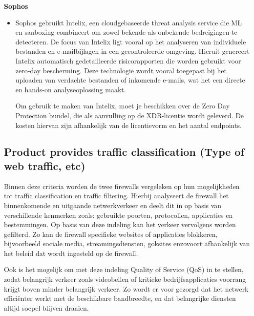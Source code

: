 \textbf{Sophos}
\begin{itemize}[label=\textbullet]
    \item Sophos gebruikt Intelix, een cloudgebaseerde threat analysis service die ML en sanboxing combineert om zowel bekende als onbekende bedreigingen te detecteren. De focus van Intelix ligt vooral op het analyseren van individuele bestanden en e-mailbijlagen in een gecontroleerde omgeving. Hieruit genereert Intelix automatisch gedetailleerde risicorapporten die worden gebruikt voor zero-day bescherming. Deze technologie wordt vooral toegepast bij het uploaden van verdachte bestanden of inkomende e-mails, wat het een directe en hands-on analyseoplossing maakt. \autocite{SophosIN2025}
    
    Om gebruik te maken van Intelix, moet je beschikken over de Zero Day Protection bundel, die als aanvulling op de XDR-licentie wordt geleverd. De kosten hiervan zijn afhankelijk van de licentievorm en het aantal endpoints.
\end{itemize}



\subsection{Product provides traffic classification (Type of web traffic, etc)}

Binnen deze criteria worden de twee firewalls vergeleken op hun mogelijkheden tot traffic classification en traffic filtering. Hierbij analyseert de firewall het binnenkomende en uitgaande netwerkverkeer en deelt dit in op basis van verschillende kenmerken zoals: gebruikte poorten, protocollen, applicaties en bestemmingen. Op basis van deze indeling kan het verkeer vervolgens worden gefilterd. Zo kan de firewall specifieke websites of applicaties blokkeren, bijvoorbeeld sociale media, streamingsdiensten, goksites enzovoort afhankelijk van het beleid dat wordt ingesteld op de firewall.

\vspace{5mm}
Ook is het mogelijk om met deze indeling Quality of Service (QoS) in te stellen, zodat belangrijk verkeer zoals videobellen of kritieke bedrijfsapplicaties voorrang krijgt boven minder belangrijk verkeer. Zo wordt er voor gezorgd dat het netwerk efficiënter werkt met de beschikbare bandbreedte, en dat belangrijke diensten altijd soepel blijven draaien.

